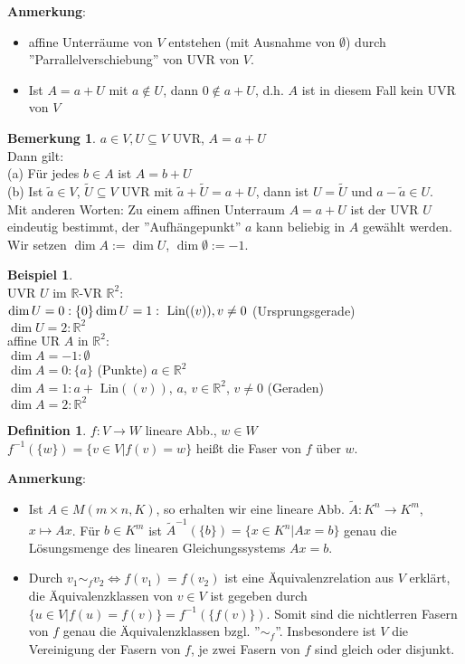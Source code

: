 \documentclass[10pt,a4paper,numbers=endperiod]{scrartcl}
\theoremstyle{definition}
\newtheorem{defi}[satz]{Definition}
\newtheorem{bem}[satz]{Bemerkung}
\newtheorem{bsp}[satz]{Beispiel}
\def\RR{{\mathbb R}}
\begin{document}
\textbf{Anmerkung}: \begin{itemize}
	\item affine Unterräume von $V$ entstehen (mit Ausnahme von $\emptyset$) durch ''Parrallelverschiebung'' von UVR von $V$.
	\item Ist $A = a+U$ mit $a \notin U$, dann $0 \notin a+U$, d.h. $A$ ist in diesem Fall kein UVR von $V$
\end{itemize}
\newpage
\begin{bem}
	$a \in V, U \subseteq V$ UVR, $A= a+U$\\
	Dann gilt:\\
	(a) Für jedes $b \in A$ ist $A=b+U$\\
	(b) Ist $\tilde{a} \in V$, $\tilde{U} \subseteq V$ UVR mit $\tilde{a}+\tilde{U}=a+U$, dann ist $U=\tilde{U}$ und $a-\tilde{a} \in U$.\\
	Mit anderen Worten: Zu einem affinen Unterraum $A=a+U$ ist der UVR $U$ eindeutig bestimmt, der ''Aufhängepunkt'' $a$ kann beliebig in $A$ gewählt werden. Wir setzen $\dim A := \dim U$, $\dim \emptyset := -1$.
\end{bem}

\begin{bsp}
	$ $\\
	UVR $U$ im $\RR$-VR $\RR^2$:\\
	$\dim U = 0 :\{0\}\\
	\dim U = 1 : \text{ Lin}((v)), v \neq 0$ (Ursprungsgerade)\\
	$\dim U = 2 : \RR^2$\\
	affine UR $A$ in $\RR^2$:\\
	$\dim A = -1: \emptyset$\\
	$\dim A = 0: \{a\}$ (Punkte) $a \in \RR^2$\\
	$\dim A = 1: a + \text{ Lin}((v))$, $a$, $v \in \RR^2$, $v \neq 0$ (Geraden)\\
	$\dim A = 2: \RR^2$
\end{bsp}

\begin{defi}
	$f: V \rightarrow W$ lineare Abb., $w \in W$\\
	$f^{-1}(\{w\}) = \{v\in V| f(v) = w\}$ heißt die Faser von $f$ über $w$.
\end{defi}

\textbf{Anmerkung}: \begin{itemize}
	\item Ist $A \in M(m\times n,K)$, so erhalten wir eine lineare Abb. $\tilde{A}: K^n \rightarrow K^m$, $x\mapsto Ax$. Für $b \in K^m$ ist $\tilde{A}^{-1}(\{b\})= \{x \in K^n|Ax=b\}$ genau die Lösungsmenge des linearen Gleichungssystems $Ax= b$.
	\item Durch $v_1 \sim_f v_2 \Leftrightarrow f(v_1) = f(v_2)$ ist eine Äquivalenzrelation aus $V$ erklärt, die Äquivalenzklassen von $v \in V$  ist gegeben durch $\{u \in V|f(u)=f(v)\}= f^{-1}(\{f(v)\}).$ Somit sind die nichtlerren Fasern von $f$ genau die Äquivalenzklassen bzgl. ''$\sim_f$''. Insbesondere ist $V$ die Vereinigung der Fasern von $f$, je zwei Fasern von $f$ sind gleich oder disjunkt.
\end{itemize}
\end{document}
